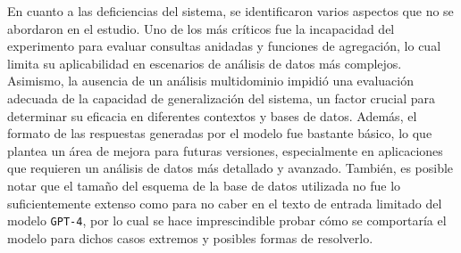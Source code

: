 En cuanto a las deficiencias del sistema, se identificaron varios aspectos que no se abordaron en el estudio. Uno de los más críticos fue la incapacidad del experimento para evaluar consultas anidadas y funciones de agregación, lo cual limita su aplicabilidad en escenarios de análisis de datos más complejos. Asimismo, la ausencia de un análisis multidominio impidió una evaluación adecuada de la capacidad de generalización del sistema, un factor crucial para determinar su eficacia en diferentes contextos y bases de datos. Además, el formato de las respuestas generadas por el modelo fue bastante básico, lo que plantea un área de mejora para futuras versiones, especialmente en aplicaciones que requieren un análisis de datos más detallado y avanzado. También, es posible notar que el tamaño del esquema de la base de datos utilizada no fue lo suficientemente extenso como para no caber en el texto de entrada limitado del modelo \texttt{GPT-4}, por lo cual se hace imprescindible probar cómo se comportaría el modelo para dichos casos extremos y posibles formas de resolverlo.

